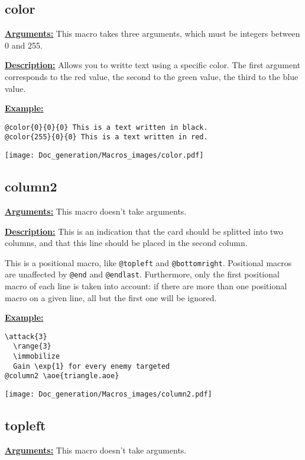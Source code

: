 \documentclass{article}
\begin{document}
\subsection{color}
\textbf{\underline{Arguments:}} This macro takes three arguments, which must be integers between 0 and 255.

\textbf{\underline{Description:}} Allows you to writte text using a specific color. The first argument corresponds to the red value, the second to the green value, the third to the blue value.

\textbf{\underline{Example:}}

\begin{center}
\begin{BVerbatim}
@color{0}{0}{0} This is a text written in black.
@color{255}{0}{0} This is a text written in red.
\end{BVerbatim}

\texttt{[image: Doc\_generation/Macros\_images/color.pdf]}
\end{center}


\subsection{column2}
\textbf{\underline{Arguments:}} This macro doesn't take arguments.

\textbf{\underline{Description:}} This is an indication that the card should be splitted into two columns, and that this line should be placed in the second column.

This is a positional macro, like \verb`@topleft` and \verb`@bottomright`. Positional macros are unaffected by \verb`@end` and \verb`@endlast`. Furthermore, only the first positional macro of each line is taken into account: if there are more than one positional macro on a given line, all but the first one will be ignored.

\textbf{\underline{Example:}}

\begin{center}
\begin{BVerbatim}
\attack{3}
  \range{3}
  \immobilize
  Gain \exp{1} for every enemy targeted
@column2 \aoe{triangle.aoe}
\end{BVerbatim}

\texttt{[image: Doc\_generation/Macros\_images/column2.pdf]}
\end{center} 

\subsection{topleft}
\textbf{\underline{Arguments:}} This macro doesn't take arguments.
\end{document}

